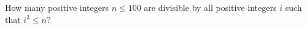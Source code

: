 How many positive integers $n \le 100$ are divisible by all positive integers $i$ such that $i^3 \le n$?
